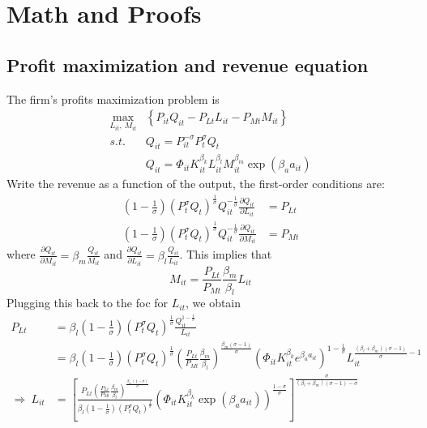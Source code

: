 \documentclass[11pt]{article}
\begin{document}
\section{Math and Proofs} \label{app_revenue_equation}
\subsection{Profit maximization and revenue equation} \label{app_revenue_equation}
The firm's profits maximization problem is
\begin{align*}
\max_{L_{it},\,M_{it}} & \left\{ P_{it}Q_{it}-P_{Lt}L_{it}-P_{Mt}M_{it}\right\} \\
s.t.\, & Q_{it}=P_{it}^{-\sigma}P_{t}^{\sigma}Q_{t}\\
 & Q_{it}=\Phi_{it}K_{it}^{\beta_{k}}L_{it}^{\beta_{l}}M_{it}^{\beta_{m}}\exp\left(\beta_{a}a_{it}\right)
\end{align*}
Write the revenue as a function of the output, the first-order conditions
are:
\begin{align}
\left(1-\frac{1}{\sigma}\right)\left(P_{t}^{\sigma}Q_{t}\right)^{\frac{1}{\sigma}}Q_{it}^{-\frac{1}{\sigma}}\frac{\partial Q_{it}}{\partial L_{it}} & =P_{Lt}\\
\left(1-\frac{1}{\sigma}\right)\left(P_{t}^{\sigma}Q_{t}\right)^{\frac{1}{\sigma}}Q_{it}^{-\frac{1}{\sigma}}\frac{\partial Q_{it}}{\partial M_{it}} & =P_{Mt}
\end{align}
where $\frac{\partial Q_{it}}{\partial M_{it}}=\beta_{m}\frac{Q_{it}}{M_{it}}$
and $\frac{\partial Q_{it}}{\partial L_{it}}=\beta_{l}\frac{Q_{it}}{L_{it}}$.
This implies that 
\begin{equation}
M_{it}=\frac{P_{Lt}}{P_{Mt}}\frac{\beta_{m}}{\beta_{l}}L_{it}
\end{equation}
Plugging this back to the foc for $L_{it}$, we obtain
\begin{align}
P_{Lt} & =\beta_{l}\left(1-\frac{1}{\sigma}\right)\left(P_{t}^{\sigma}Q_{t}\right)^{\frac{1}{\sigma}}\frac{Q_{it}^{1-\frac{1}{\sigma}}}{L_{it}}\nonumber \\
 & =\beta_{l}\left(1-\frac{1}{\sigma}\right)\left(P_{t}^{\sigma}Q_{t}\right)^{\frac{1}{\sigma}}\left(\frac{P_{Lt}}{P_{Mt}}\frac{\beta_{m}}{\beta_{l}}\right)^{\frac{\beta_{m}\left(\sigma-1\right)}{\sigma}}\left(\Phi_{it}K_{it}^{\beta_{k}}e^{\beta_{a}a_{it}}\right)^{1-\frac{1}{\sigma}}L_{it}^{\frac{\left(\beta_{l}+\beta_{m}\right)\left(\sigma-1\right)}{\sigma}-1}\nonumber \\
\Rightarrow\:L_{it} & =\left[\frac{P_{Lt}\left(\frac{P_{Lt}}{P_{Mt}}\frac{\beta_{m}}{\beta_{l}}\right)^{\frac{\beta_{m}\left(1-\sigma\right)}{\sigma}}}{\beta_{l}\left(1-\frac{1}{\sigma}\right)\left(P_{t}^{\sigma}Q_{t}\right)^{\frac{1}{\sigma}}}\left(\Phi_{it}K_{it}^{\beta_{k}}\exp\left(\beta_{a}a_{it}\right)\right)^{\frac{1-\sigma}{\sigma}}\right]^{\frac{\sigma}{\left(\beta_{l}+\beta_{m}\right)\left(\sigma-1\right)-\sigma}}
\end{align}
\end{document}
